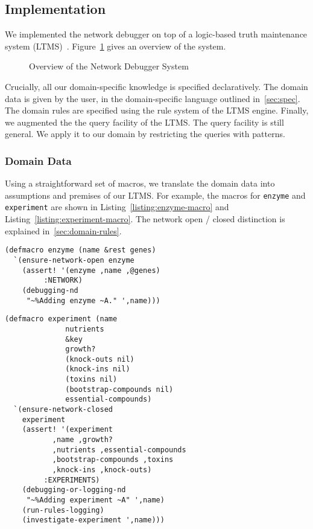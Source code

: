 \subsection{Implementation}

We implemented the network debugger on top of a logic-based truth maintenance system (LTMS)~\cite{bps93}.
Figure~\ref{figure:system} gives an overview of the system.

\begin{figure}[htb]
\centering
{}
\caption{\label{figure:system} Overview of the Network Debugger System}
\end{figure}

Crucially, all our domain-specific knowledge is specified
declaratively. The domain data is given by the user, in the
domain-specific language outlined in~\ref{sec:spec}. The domain rules
are specified using the rule system of the LTMS engine. Finally, we
augmented the the query facility of the LTMS. The query facility is
still general. We apply it to our domain by restricting the queries
with patterns.

\subsubsection{Domain Data}

Using a straightforward set of macros, we translate the domain data
into assumptions and premises of our LTMS. For example, the macros for
{\small\tt enzyme} and {\small\tt experiment} are shown in
Listing~\ref{listing:enzyme-macro} and
Listing~\ref{listing:experiment-macro}. The network open / closed
distinction is explained in~\ref{sec:domain-rules}.

\begin{lstlisting}[label={listing:enzyme-macro},caption={Enzyme Macro}]
(defmacro enzyme (name &rest genes)
  `(ensure-network-open enzyme
    (assert! '(enzyme ,name ,@genes)
	     :NETWORK)
    (debugging-nd
     "~%Adding enzyme ~A." ',name)))
\end{lstlisting}

\begin{lstlisting}[label={listing:experiment-macro},caption={Experiment Macro}]
(defmacro experiment (name 
		      nutrients
		      &key
		      growth?
		      (knock-outs nil)
		      (knock-ins nil)
		      (toxins nil)
		      (bootstrap-compounds nil)
		      essential-compounds)
  `(ensure-network-closed 
    experiment
    (assert! '(experiment 
	       ,name ,growth? 
	       ,nutrients ,essential-compounds
	       ,bootstrap-compounds ,toxins
	       ,knock-ins ,knock-outs)
	     :EXPERIMENTS)
    (debugging-or-logging-nd
     "~%Adding experiment ~A" ',name)
    (run-rules-logging)
    (investigate-experiment ',name)))
\end{lstlisting}


